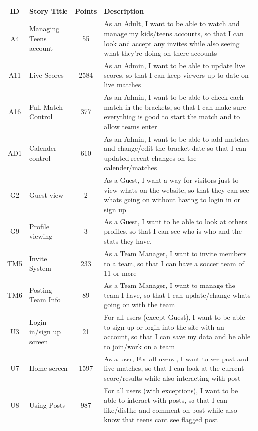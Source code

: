 \documentclass{article}
\begin{document}
\begin{table}[h!]
\centering
\begin{tabular}{c l c p{10cm}}
\hline
\textbf{ID} & \textbf{Story Title} & \textbf{Points} & \textbf{Description} \\
\hline
A4 & Managing Teens account & 55 & As an Adult, I want to be able to watch and manage my kids/teens accounts, so that I can look and accept any invites while also seeing what they're doing on there accounts \\ \hline
A11 & Live Scores & 2584 & As an Admin, I want to be able to update live scores, so that I can keep viewers up to date on live matches 
\\ \hline
A16 & Full Match Control & 377 & As an Admin, I want to be able to check each match in the brackets, so that I can make sure everything is good to start the match and to allow teams enter 
\\ \hline
AD1 & Calender control & 610 & As an Admin, I want to be able to add matches and change/edit the bracket date so that I can updated recent changes on the calender/matches 
\\ \hline
G2 & Guest view & 2 & As a Guest, I want a way for visitors just to view whats on the website, so that they can see whats going on without having to login in or sign up \\ \hline
G9 & Profile viewing & 3 & As a Guest, I want to be able to look at others profiles, so that I can see who is who and the stats they have. 
\\ \hline
TM5 & Invite System & 233 & As a Team Manager, I want to invite members to a team, so that I can have a soccer team of 11 or more 
\\ \hline
TM6 & Posting Team Info & 89 & As a Team Manager, I want to manage the team I have, so that I can update/change whats going on with the team
\\ \hline
U3 & Login in/sign up screen & 21 & For all users (except Guest), I want to be able to sign up or login into the site with an account, so that I can save my data and be able to join/work on a team
\\ \hline
U7 & Home screen & 1597 & As a user, For all users , I want to see post and live matches, so that I can look at the current score/results while also interacting with post 
\\ \hline
U8 & Using Posts & 987 & For all users (with exceptions), I want to be able to interact with posts, so that I can like/dislike and comment on post while also know that teens cant see flagged post

\end{tabular}
\end{table}
\end{document}
